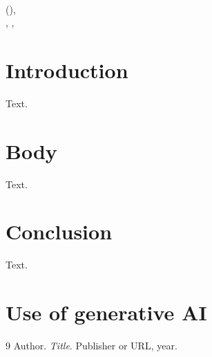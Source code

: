 \documentclass[a4paper,11pt]{article}
\begin{document}
\begin{center}
  {\large\bfseries \reporttitle}\\[3pt]
  {\small \coursename{} (\coursecode), \lecturer{} \textbar{} \reportsubtitle}\\[2pt]
  {\small \authorname\ifx\authorid\kitempty\else, \authorid\fi, \institution{} \textbar{} \reportdate}
\end{center}
\vspace{-4pt}

\section{Introduction}
Text.

\section{Body}
Text.

\section{Conclusion}
Text.

\section*{Use of generative AI}

{\small
\begin{thebibliography}{9}\setlength{\itemsep}{0pt}
Author. \emph{Title}. Publisher or URL, year.
\end{thebibliography}}
\end{document}
